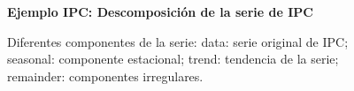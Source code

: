 \begin{figure}[h]
	\centering
	\textbf{Ejemplo IPC: Descomposición de la serie de IPC}\par\medskip
	\caption{Diferentes componentes de la serie: data: serie original de IPC; seasonal: componente estacional; trend: tendencia de la serie; remainder: componentes irregulares.}\label{fig20}
\end{figure}



